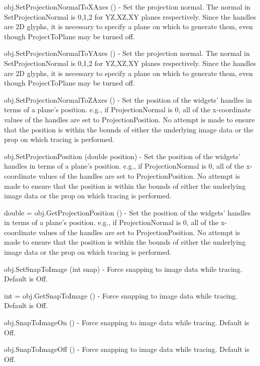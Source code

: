 \begin{DoxyItemize}
\item {\ttfamily obj.\-Set\-Projection\-Normal\-To\-X\-Axes ()} -\/ Set the projection normal. The normal in Set\-Projection\-Normal is 0,1,2 for Y\-Z,X\-Z,X\-Y planes respectively. Since the handles are 2\-D glyphs, it is necessary to specify a plane on which to generate them, even though Project\-To\-Plane may be turned off.  
\item {\ttfamily obj.\-Set\-Projection\-Normal\-To\-Y\-Axes ()} -\/ Set the projection normal. The normal in Set\-Projection\-Normal is 0,1,2 for Y\-Z,X\-Z,X\-Y planes respectively. Since the handles are 2\-D glyphs, it is necessary to specify a plane on which to generate them, even though Project\-To\-Plane may be turned off.  
\item {\ttfamily obj.\-Set\-Projection\-Normal\-To\-Z\-Axes ()} -\/ Set the position of the widgets' handles in terms of a plane's position. e.\-g., if Projection\-Normal is 0, all of the x-\/coordinate values of the handles are set to Projection\-Position. No attempt is made to ensure that the position is within the bounds of either the underlying image data or the prop on which tracing is performed.  
\item {\ttfamily obj.\-Set\-Projection\-Position (double position)} -\/ Set the position of the widgets' handles in terms of a plane's position. e.\-g., if Projection\-Normal is 0, all of the x-\/coordinate values of the handles are set to Projection\-Position. No attempt is made to ensure that the position is within the bounds of either the underlying image data or the prop on which tracing is performed.  
\item {\ttfamily double = obj.\-Get\-Projection\-Position ()} -\/ Set the position of the widgets' handles in terms of a plane's position. e.\-g., if Projection\-Normal is 0, all of the x-\/coordinate values of the handles are set to Projection\-Position. No attempt is made to ensure that the position is within the bounds of either the underlying image data or the prop on which tracing is performed.  
\item {\ttfamily obj.\-Set\-Snap\-To\-Image (int snap)} -\/ Force snapping to image data while tracing. Default is Off.  
\item {\ttfamily int = obj.\-Get\-Snap\-To\-Image ()} -\/ Force snapping to image data while tracing. Default is Off.  
\item {\ttfamily obj.\-Snap\-To\-Image\-On ()} -\/ Force snapping to image data while tracing. Default is Off.  
\item {\ttfamily obj.\-Snap\-To\-Image\-Off ()} -\/ Force snapping to image data while tracing. Default is Off.  

\end{DoxyItemize}
